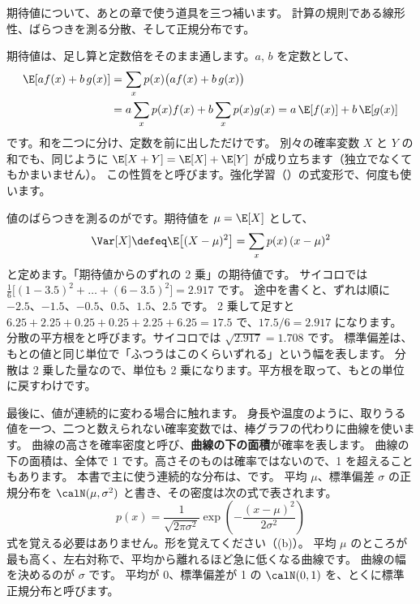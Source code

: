 期待値について、あとの章で使う道具を三つ補います。
計算の規則である線形性、ばらつきを測る分散、そして正規分布です。

期待値は、足し算と定数倍をそのまま通します。$a$, $b$ を定数として、
\begin{equation}
\begin{aligned}
\E[a f(x)+b\,g(x)]&=\sum_x p(x)\bigl(a f(x)+b\,g(x)\bigr)\\
&=a\sum_x p(x)f(x)+b\sum_x p(x)g(x)=a\,\E[f(x)]+b\,\E[g(x)]
\end{aligned}
\label{eq:math-linearity}
\end{equation}
です。和を二つに分け、定数を前に出しただけです。
別々の確率変数 $X$ と $Y$ の和でも、同じように $\E[X+Y]=\E[X]+\E[Y]$ が成り立ちます（独立でなくてもかまいません）。
この性質をと呼びます。強化学習（）の式変形で、何度も使います。

値のばらつきを測るのがです。期待値を $\mu=\E[X]$ として、
\begin{equation}
\Var[X]\defeq\E\bigl[(X-\mu)^{2}\bigr]=\sum_{x}p(x)\,(x-\mu)^{2}
\label{eq:math-variance}
\end{equation}
と定めます。「期待値からのずれの 2 乗」の期待値です。
サイコロでは $\frac{1}{6}\bigl[(1-3.5)^{2}+\dots+(6-3.5)^{2}\bigr]=2.917$ です。
途中を書くと、ずれは順に $-2.5$、$-1.5$、$-0.5$、$0.5$、$1.5$、$2.5$ です。
2 乗して足すと $6.25+2.25+0.25+0.25+2.25+6.25=17.5$ で、$17.5/6=2.917$ になります。
分散の平方根をと呼びます。サイコロでは $\sqrt{2.917}=1.708$ です。
標準偏差は、もとの値と同じ単位で「ふつうはこのくらいずれる」という幅を表します。
分散は 2 乗した量なので、単位も 2 乗になります。平方根を取って、もとの単位に戻すわけです。

最後に、値が連続的に変わる場合に触れます。
身長や温度のように、取りうる値を一つ、二つと数えられない確率変数では、棒グラフの代わりに曲線を使います。
曲線の高さを確率密度と呼び、\textbf{曲線の下の面積}が確率を表します。
曲線の下の面積は、全体で 1 です。高さそのものは確率ではないので、1 を超えることもあります。
本書で主に使う連続的な分布は、です。
平均 $\mu$、標準偏差 $\sigma$ の正規分布を $\calN(\mu,\sigma^{2})$ と書き、その密度は次の式で表されます。
\begin{equation}
p(x)=\frac{1}{\sqrt{2\pi\sigma^{2}}}\exp\!\left(-\frac{(x-\mu)^{2}}{2\sigma^{2}}\right)
\label{eq:math-normal}
\end{equation}
式を覚える必要はありません。形を覚えてください（(b)）。
平均 $\mu$ のところが最も高く、左右対称で、平均から離れるほど急に低くなる曲線です。
曲線の幅を決めるのが $\sigma$ です。
平均が 0、標準偏差が 1 の $\calN(0,1)$ を、とくに標準正規分布と呼びます。

